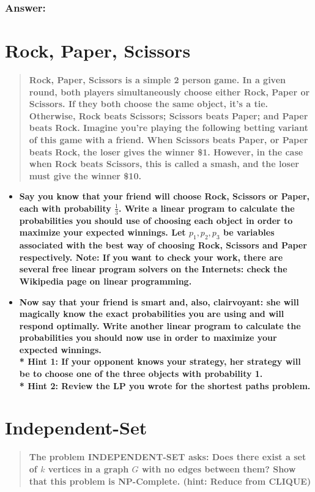 \documentclass[titlepage]{article}\usepackage[]{graphicx}\usepackage[]{color}
\begin{document}
  \subsubsection{Answer:}


\section{Rock, Paper, Scissors}
  \begin{quote}
    \textbf{Rock, Paper, Scissors is a simple 2 person game. In a given round,
    both players simultaneously choose either Rock, Paper or Scissors. If they
    both choose the same object, it’s a tie. Otherwise, Rock beats Scissors;
    Scissors beats Paper; and Paper beats Rock. Imagine you’re playing the
    following betting variant of this game with a friend. When Scissors beats
    Paper, or Paper beats Rock, the loser gives the winner \$1. However, in the case
    when Rock beats Scissors, this is called a \textbf{smash}, and the loser must give the
    winner \$10.}
  \end{quote}

  \begin{itemize}
    \item \textbf{Say you know that your friend will choose Rock, Scissors or
        Paper, each with probability $\frac{1}{3}$. Write a linear program to
        calculate the probabilities you should use of choosing each object in
        order to maximize your expected winnings. Let $p_1,p_2,p_3$ be variables
        associated with the best way of choosing Rock, Scissors and Paper
        respectively. Note: If you want to check your work, there are several free
        linear program solvers on the Internets: check the Wikipedia page on linear
        programming.} 
      \item \textbf{Now say that your friend is smart and, also,
        clairvoyant: she will magically know the exact probabilities you are
        using and will respond optimally. Write another linear program to
        calculate the probabilities you should now use in order to maximize your
        expected winnings. \\* Hint 1: If your opponent knows your strategy, her
        strategy will be to choose one of the three objects with probability 1.
      \\* Hint 2: Review the LP you wrote for the shortest paths problem.}
  \end{itemize}

\section{Independent-Set}
  \begin{quote}
    \textbf{The problem INDEPENDENT-SET asks: Does there exist a set of $k$
    vertices in a graph $G$ with no edges between them? Show that this problem is
  NP-Complete. (hint: Reduce from CLIQUE)}
  \end{quote}
\end{document}
